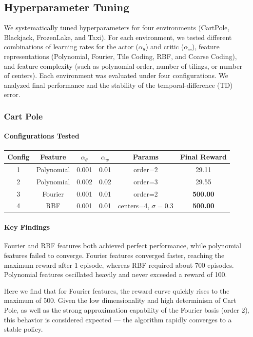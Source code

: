 \documentclass{article}
\begin{document}
\subsection{Hyperparameter Tuning}

We systematically tuned hyperparameters for four environments (CartPole, Blackjack, FrozenLake, and Taxi). For each environment, we tested different combinations of learning rates for the actor ($\alpha_\theta$) and critic ($\alpha_w$), feature representations (Polynomial, Fourier, Tile Coding, RBF, and Coarse Coding), and feature complexity (such as polynomial order, number of tilings, or number of centers).  
Each environment was evaluated under four configurations. We analyzed final performance and the stability of the temporal-difference (TD) error.

\subsubsection{Cart Pole}

\paragraph{Configurations Tested}
\begin{center}
\begin{tabular}{c c c c c c}
\hline
Config & Feature & $\alpha_\theta$ & $\alpha_w$ & Params & Final Reward \\
\hline
1 & Polynomial & 0.001 & 0.01 & order=2 & 29.11 \\
2 & Polynomial & 0.002 & 0.02 & order=3 & 29.55 \\
3 & Fourier & 0.001 & 0.01 & order=2 & \textbf{500.00} \\
4 & RBF & 0.001 & 0.01 & centers=4, $\sigma=0.3$ & \textbf{500.00} \\
\hline
\end{tabular}
\end{center}

\paragraph{Key Findings}
Fourier and RBF features both achieved perfect performance, while polynomial features failed to converge. Fourier features converged faster, reaching the maximum reward after 1 episode, whereas RBF required about 700 episodes. Polynomial features oscillated heavily and never exceeded a reward of 100.

Here we find that for Fourier features, the reward curve quickly rises to the maximum of 500. Given the low dimensionality and high determinism of Cart Pole, as well as the strong approximation capability of the Fourier basis (order 2), this behavior is considered expected — the algorithm rapidly converges to a stable policy.
\end{document}
